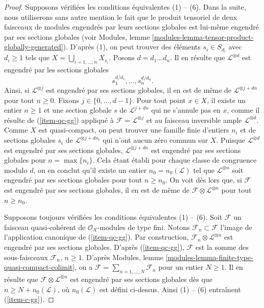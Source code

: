 \begin{proof}
\medskip\noindent
Supposons vérifiées les conditions équivalentes (1) -- (6). Dans la suite,
nous utiliserons sans autre mention le fait que le produit tensoriel de deux
faisceaux de modules engendrés par leurs sections globales est lui-même
engendré par ses sections globales (voir
Modules, lemme \ref{modules-lemma-tensor-product-globally-generated}).
D'après (1), on peut trouver des éléments $s_i \in S_{d_i}$ avec $d_i \geq 1$
tels que $X = \bigcup_{i = 1, \ldots, n} X_{s_i}$.
Posons $d = d_1\ldots d_n$. Il en résulte que $\mathcal{L}^{\otimes d}$
est engendré par les sections globales
$$
s_1^{d/d_1}, \ldots, s_n^{d/d_n}.
$$
Ainsi, si $\mathcal{L}^{\otimes j}$ est engendré par ses sections globales,
il en est de même de $\mathcal{L}^{\otimes j + dn}$ pour tout $n \geq 0$.
Fixons $j \in \{0, \ldots, d - 1\}$. Pour tout point $x \in X$, il
existe un entier $n \geq 1$ et une section globale $s$ de $\mathcal{L}^{j + dn}$
qui ne s'annule pas en $x$, comme il résulte de (\ref{item-qc-gg}) appliqué
à $\mathcal{F} = \mathcal{L}^{\otimes j}$ et au faisceau inversible ample
$\mathcal{L}^{\otimes d}$. Comme $X$ est quasi-compact,
on peut trouver une famille finie d'entiers $n_i$ et de sections globales
$s_i$ de $\mathcal{L}^{\otimes j + dn_i}$ qui n'ont aucun zéro commun
sur $X$. Puisque $\mathcal{L}^{\otimes d}$ est engendré par ses sections globales,
$\mathcal{L}^{\otimes j + dn}$ est engendré par ses sections globales pour $n = \max\{n_i\}$.
Cela étant établi pour chaque classe de congruence modulo $d$,
on en conclut qu'il existe un entier $n_0 = n_0(\mathcal{L})$ tel que
$\mathcal{L}^{\otimes n}$ soit engendré par ses sections globales pour tout $n \geq n_0$.
On voit dès lors que, si $\mathcal{F}$ est engendré par ses sections globales,
il en est de même de $\mathcal{F} \otimes \mathcal{L}^{\otimes n}$ pour tout
$n \geq n_0$.

\medskip\noindent
Supposons toujours vérifiées les conditions équivalentes (1) -- (6).
Soit $\mathcal{F}$ un faisceau quasi-cohérent
de $\mathcal{O}_X$-modules de type fini.
Notons $\mathcal{F}_n \subset \mathcal{F}$ l'image de l'application
canonique de (\ref{item-qc-gg}). Par construction,
$\mathcal{F}_n \otimes \mathcal{L}^{\otimes n}$ est
engendré par ses sections globales. D'après (\ref{item-qc-gg}),
$\mathcal{F}$ est la somme des sous-faisceaux $\mathcal{F}_n$,
$n \geq 1$. D'après
Modules, lemme \ref{modules-lemma-finite-type-quasi-compact-colimit},
on a $\mathcal{F} = \sum_{n = 1, \ldots, N} \mathcal{F}_n$
pour un entier $N \geq 1$. Il en résulte que
$\mathcal{F} \otimes \mathcal{L}^{\otimes n}$ est engendré par
ses sections globales dès que $n \geq N + n_0(\mathcal{L})$, où $n_0(\mathcal{L})$
est défini ci-dessus. Ainsi (1) -- (6) entraînent (\ref{item-c-gg}).


\end{proof}
